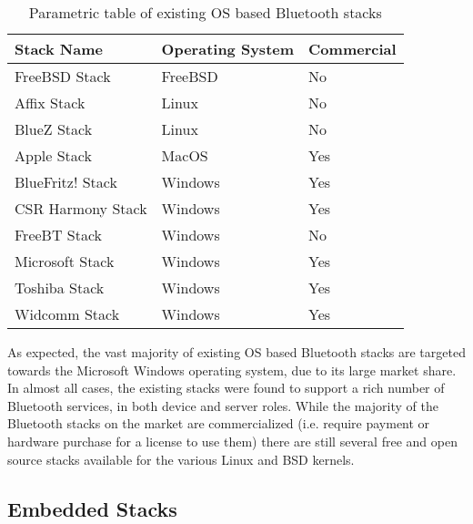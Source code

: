\begin{table}[H]
	\begin{center}
		\begin{tabular}{ | l | l | l |}
			\hline
			\textbf{Stack Name}	& \textbf{Operating System}	& \textbf{Commercial} \\ \hline

			FreeBSD Stack		& FreeBSD	& No	\\ \hline
			Affix Stack			& Linux		& No	\\ \hline
			BlueZ Stack			& Linux		& No	\\ \hline
			Apple Stack			& MacOS		& Yes	\\ \hline
			BlueFritz! Stack	& Windows	& Yes	\\ \hline
			CSR Harmony Stack	& Windows	& Yes	\\ \hline
			FreeBT Stack 		& Windows	& No	\\ \hline
			Microsoft Stack		& Windows	& Yes	\\ \hline
			Toshiba Stack		& Windows	& Yes	\\ \hline
			Widcomm Stack		& Windows	& Yes	\\ \hline
		\end{tabular}
		\caption[Existing Operating System Bluetooth Stacks]{Parametric table of existing OS based Bluetooth stacks}
		\label{tab:osbtstacks}
	\end{center}
\end{table}

As expected, the vast majority of existing OS based Bluetooth stacks are targeted towards the Microsoft Windows operating system, due to its large market share. In almost all cases, the existing stacks were found to support a rich number of Bluetooth services, in both device and server roles. While the majority of the Bluetooth stacks on the market are commercialized (i.e. require payment or hardware purchase for a license to use them) there are still several free and open source stacks available for the various Linux and BSD kernels.


\subsection{Embedded Stacks}

